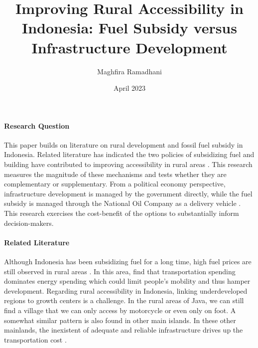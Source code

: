 \documentclass[letterpaper,11pt,leqno]{article}
\begin{document}
\title{Improving Rural Accessibility in Indonesia: Fuel Subsidy versus Infrastructure Development}
\author{Maghfira Ramadhani}
\date{April 2023}       
\maketitle
 
\paragraph{Research Question} This paper builds on literature on rural development and fossil fuel subsidy in Indonesia. Related literature has indicated the two policies of subsidizing fuel and building have contributed to improving accessibility in rural areas \citep{asher_2020,hartojo_2022,ichsan_2021}. This research measures the magnitude of these mechanisms and tests whether they are complementary or supplementary. From a political economy perspective, infrastructure development is managed by the government directly, while the fuel subsidy is managed through the National Oil Company as a delivery vehicle \citep{ichsan_2022}. This research exercises the cost-benefit of the options to substantially inform decision-makers.

\paragraph{Related Literature} Although Indonesia has been subsidizing fuel for a long time, high fuel prices are still observed in rural areas \citep{liputan_2016, jawapos_2017}. In this area, \citet{sambodo_2019} find that transportation spending dominates energy spending which could limit people's mobility and thus hamper development. Regarding rural accessibility in Indonesia, linking underdeveloped regions to growth centers is a challenge. In the rural areas of Java, we can still find a village that we can only access by motorcycle or even only on foot. A somewhat similar pattern is also found in other main islands. In these other mainlands, the inexistent of adequate and reliable infrastructure drives up the transportation cost \citep{sandee_2016}.
\end{document}
